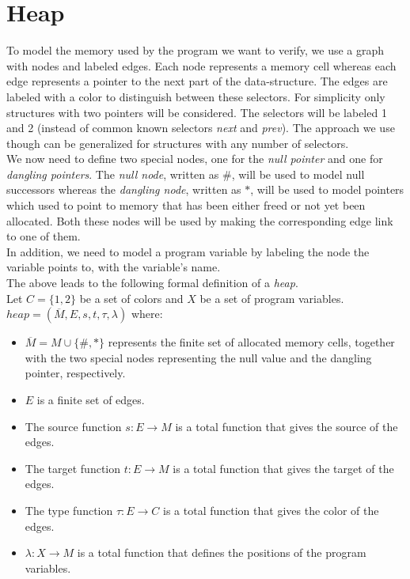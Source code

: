 \newpage
\section{Heap}

To model the memory used by the program we want to verify, we use a graph with nodes and labeled edges.
Each node represents a memory cell whereas each edge represents a pointer to the next part of the data-structure.
The edges are labeled with a color to distinguish between these selectors. For simplicity only structures with
two pointers will be considered. The selectors will be labeled 1 and 2 
(instead of common known selectors \textit{next} and \textit{prev}). The approach we use though can be generalized
for structures with any number of selectors.\\
We now need to define two special nodes, one for the \textit{null pointer} and one for \textit{dangling pointers}.
The \textit{null node}, written as $\#$, will be used to model null successors whereas the \textit{dangling node},
written as $*$, will be used to model pointers which used to point to memory that has been either freed or not yet been allocated.
Both these nodes will be used by making the corresponding edge link to one of them.\\
In addition, we need to model a program variable by labeling the node the variable points to, with the variable's name.\\
The above leads to the following formal definition of a \textit{heap}.\\
Let $C = \{1,2\}$ be a set of colors and $X$ be a set of program variables.\\

$heap = (\overline{M}, E, s, t, \tau, \lambda)$ where:

\begin{itemize}
	\item $\overline{M} = M \cup \{\#,*\}$ represents the finite set of allocated memory cells, together with the two special nodes 
		representing the null value and the dangling pointer, respectively.
	\item $E$ is a finite set of edges.
	\item The source function $s : E \rightarrow M$ is a total function that gives the source of the edges.
	\item The target function $t : E \rightarrow M$ is a total function that gives the target of the edges.
	\item The type function $\tau : E \rightarrow C$ is a total function that gives the color of the edges.
	\item $\lambda : X \rightarrow M$ is a total function that defines the positions of the program variables.
\end{itemize}

